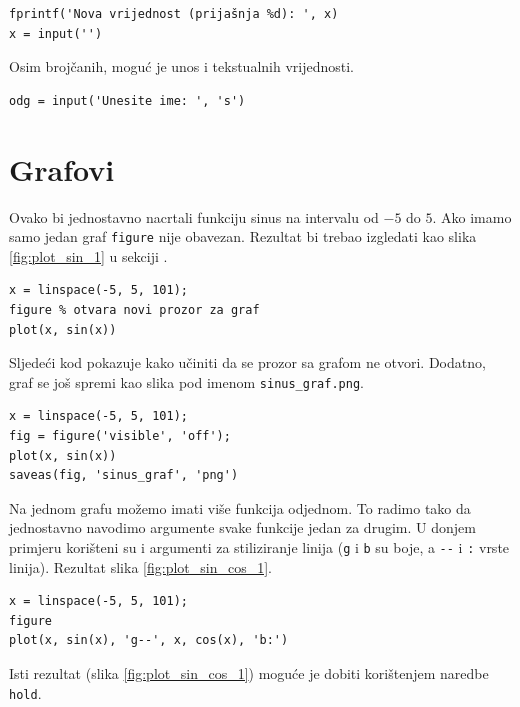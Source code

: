 \documentclass[a4paper, 10pt]{article}
\begin{document}
\begin{lstlisting}
fprintf('Nova vrijednost (prijašnja %d): ', x)
x = input('')
\end{lstlisting}

Osim brojčanih, moguć je unos i tekstualnih vrijednosti.

\begin{lstlisting}
odg = input('Unesite ime: ', 's')
\end{lstlisting}


\section{Grafovi}

Ovako bi jednostavno nacrtali funkciju sinus na intervalu od $-5$ do $5$. Ako imamo samo jedan graf \texttt{figure} nije obavezan. Rezultat bi trebao izgledati kao slika \ref{fig:plot_sin_1} u sekciji .

\begin{lstlisting}
x = linspace(-5, 5, 101);
figure % otvara novi prozor za graf
plot(x, sin(x))
\end{lstlisting}

Sljedeći kod pokazuje kako učiniti da se prozor sa grafom ne otvori. Dodatno, graf se još spremi kao slika pod imenom \texttt{sinus\_graf.png}.

\begin{lstlisting}
x = linspace(-5, 5, 101);
fig = figure('visible', 'off');
plot(x, sin(x))
saveas(fig, 'sinus_graf', 'png')
\end{lstlisting}

Na jednom grafu možemo imati više funkcija odjednom. To radimo tako da jednostavno navodimo argumente svake funkcije jedan za drugim. U donjem primjeru korišteni su i argumenti za stiliziranje linija (\texttt{g} i \texttt{b} su boje, a \texttt{-{}-} i \texttt{:} vrste linija). Rezultat slika \ref{fig:plot_sin_cos_1}.

\begin{lstlisting}
x = linspace(-5, 5, 101);
figure
plot(x, sin(x), 'g--', x, cos(x), 'b:')
\end{lstlisting}

Isti rezultat (slika \ref{fig:plot_sin_cos_1}) moguće je dobiti korištenjem naredbe \texttt{hold}.
\end{document}

